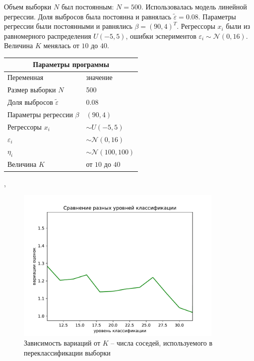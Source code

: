 Объем выборки $N$ был постоянным: $N=500$. Использовалась модель линейной регрессии. Доля выбросов была постоянна и равнялась $\widetilde{\varepsilon}=0.08$. Параметры регрессии были постоянными и равнялись $\beta=(90,4)^T$. 
Регрессоры $x_i$ были из равномерного распределения $U(-5,5)$, ошибки эспериментов $\varepsilon_i\sim \mathcal{N}(0,16)$. Величина $K$ менялась от $10$ до $40$.
\begin{center}
    \label{tab1}
    \begin{tabular}{|p{5cm}|p{5cm}|}
        \hline
        \multicolumn{2}{|c|}{Параметры программы} \\
        \hline
        Переменная&значение\\
        \hline
        Размер выборки $N$& 500\\
        \hline
        Доля выбросов $\widetilde{\varepsilon}$& 0.08\\
        \hline
        Параметры регрессии $\beta$& $(90,4)$\\
        \hline
        Регрессоры $x_i$ & $\sim U(-5,5)$\\
        \hline
        $\varepsilon_i$&$\sim \mathcal{N}(0,16)$\\
        \hline
        $\eta_i$&$\sim \mathcal{N}(100,100)$\\
        \hline
        Величина $K$  &от $10$ до $40$\\
        \hline
    \end{tabular},
\end{center}

\begin{figure}[h!]
    \centering
    \includegraphics[width=100mm]{../images/different_recl_level.pdf}
    \caption{Зависимость вариаций от $K$ -- числа соседей, используемого в переклассификации выборки\label{overflow}}
    \label{pic1}
\end{figure}

